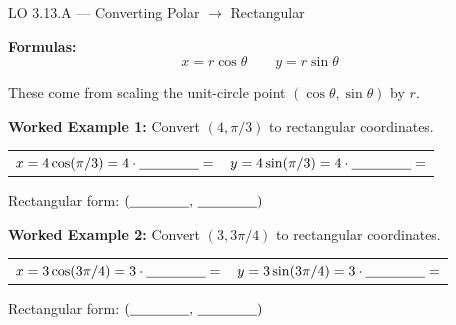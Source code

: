 \documentclass[10pt]{article}
\begin{document}
\begin{notesbox}{LO 3.13.A --- Converting Polar $\to$ Rectangular}

\textbf{Formulas:}
$$x = r\cos\theta \qquad y = r\sin\theta$$

These come from scaling the unit-circle point $(\cos\theta,\sin\theta)$ by $r$.

\vspace{8pt}
\textbf{Worked Example 1:} Convert $(4, \pi/3)$ to rectangular coordinates.

\vspace{4pt}
\begin{tabular}{ll}
$x = 4\cos(\pi/3) = 4 \cdot \underline{\hspace{1.5cm}} = $ \underline{\hspace{2cm}} &
$y = 4\sin(\pi/3) = 4 \cdot \underline{\hspace{1.5cm}} = $ \underline{\hspace{2cm}} \\
\end{tabular}

\vspace{4pt}
Rectangular form: $(\underline{\hspace{1.5cm}},\, \underline{\hspace{1.5cm}})$

\vspace{8pt}
\textbf{Worked Example 2:} Convert $(3, 3\pi/4)$ to rectangular coordinates.

\vspace{4pt}
\begin{tabular}{ll}
$x = 3\cos(3\pi/4) = 3 \cdot \underline{\hspace{1.5cm}} = $ \underline{\hspace{2.5cm}} &
$y = 3\sin(3\pi/4) = 3 \cdot \underline{\hspace{1.5cm}} = $ \underline{\hspace{2.5cm}} \\
\end{tabular}

\vspace{4pt}
Rectangular form: $(\underline{\hspace{1.5cm}},\, \underline{\hspace{1.5cm}})$

\end{notesbox}
\end{document}
